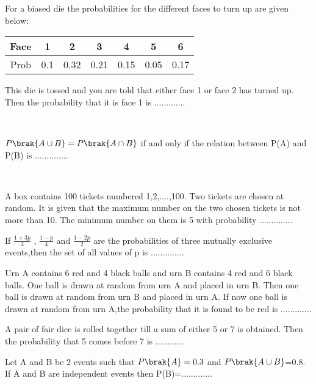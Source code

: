 \iffalse
  \title{PROBABILITY}
  \author{J.KEDARANANDA}
  \section{fitb}
\fi
    \item For a biased die the probabilities for the different faces to turn up are given below:
    \begin{center}
    \begin{tabular}{|c|c|c|c|c|c|c|}
       \hline
       Face & 1 & 2 & 3 & 4 & 5 & 6 \\
       \hline
       Prob & 0.1 & 0.32 & 0.21 & 0.15 & 0.05 & 0.17\\
       \hline 
    \end{tabular}
\end{center}\bigskip
    This die is tossed and you are told that either face 1 or face 2 has turned up. Then the probability that it is face 1 is .............
    
    \hfill{}\\
    
    \item $P\brak{A \cup B}=P\brak{A \cap B }$ if and only if the relation between P(A) and P(B) is .............. 
    
    \hfill{}\\
    \item A box contains 100 tickets numbered 1,2,....,100. Two tickets are chosen at random. It is given that the maximum number on the two chosen tickets is not more than 10. The minimum number on them is 5 with probability ..............\hfill{}\\
    \item If $\frac{1+3p}{3}$ , $\frac{1-p}{4}$ and $\frac{1-2p}{2}$ are the probabilities of three mutually exclusive events,then the set of all values of p is ..............\hfill{}\\
    \item Urn A contains 6 red and 4 black balls and urn B contains 4 red and 6 black balls. One ball is drawn at random from urn A and placed in urn B. Then one ball is drawn at random from urn B and placed in urn A. If now one ball is drawn at random from urn A,the probability that it is found to be red is .............\hfill{}\\
    \item A pair of fair dice is rolled together till a sum of either 5 or 7 is obtained. Then the probability that 5 comes before 7 is 
    ............
    \hfill{}\\
    \item Let A and B be 2 events such that $P\brak{A}=0.3$ and $P\brak{A \cup B}$=0.8. If A and B are independent events then P(B)=.............\hfill{}\\
    
